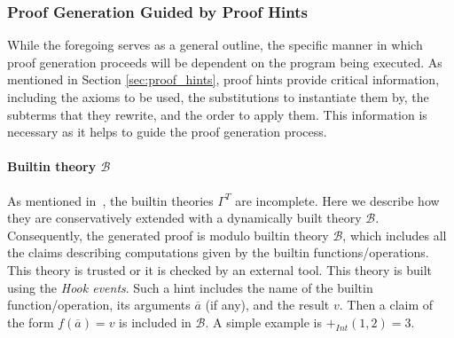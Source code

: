 \documentclass{article}
\theoremstyle{plain}
\theoremstyle{definition}
\newcommand{\Int}{\ensuremath{\mathit{Int}}}
\newcommand{\PlusInt}{\ensuremath{\mathbin{{\texttt{+}}_\Int}}}
\begin{document}
\subsubsection{Proof Generation Guided by Proof Hints}
\label{sec:proof_gen_alg}

While the foregoing serves as a general outline, the specific manner in which proof generation proceeds will be dependent on the program being executed. As mentioned in Section \ref{sec:proof_hints}, proof hints provide critical information, including the axioms to be used, the substitutions to instantiate them by, the subterms that they rewrite, and the order to apply them. This information is necessary as it helps to guide the proof generation process.

\paragraph{Builtin theory $\mathcal{B}$\\}
As mentioned in~, the builtin theories $\Gamma^T$ are incomplete. Here we describe how they are conservatively extended with a dynamically built theory $\mathcal{B}$.
Consequently, the generated proof is modulo builtin theory $\mathcal{B}$, which includes all the claims describing computations given by the builtin functions/operations. This theory is trusted or it is checked by an external tool. This theory is built using the \textit{Hook events}. Such a hint includes the name of the builtin function/operation, its arguments $\overline{a}$ (if any), and the result $v$. Then a claim of the form $f(\overline{a})=v$ is included in $\mathcal{B}$. A simple example is $\PlusInt(1, 2) = 3$.
\end{document}
